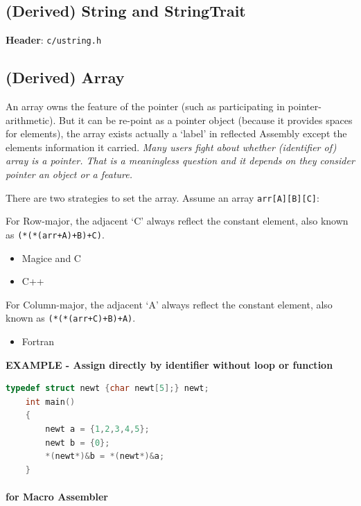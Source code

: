 

\subsection{(Derived) String and StringTrait}

\textbf{Header}: \verb|c/ustring.h|



\subsection{(Derived) Array}

An array owns the feature of the pointer (such as participating in pointer-arithmetic). But it can be re-point as a pointer object (because it provides spaces for elements), the array exists actually a `label' in reflected Assembly except the elements information it carried. \textit{Many users fight about whether (identifier of) array is a pointer. That is a meaningless question and it depends on they consider pointer an object or a feature.}

There are two strategies to set the array. Assume an array \verb|arr[A][B][C]|:

For Row-major, the adjacent `C' always reflect the constant element, also known as \verb|(*(*(arr+A)+B)+C)|.

\begin{itemize}

\item Magice and C
\item C++
\end{itemize}

For Column-major, the adjacent `A' always reflect the constant element, also known as \verb|(*(*(arr+C)+B)+A)|.

\begin{itemize}

\item Fortran
\end{itemize}

\textbf{EXAMPLE - Assign directly by identifier without loop or function}

\begin{lstlisting}[language=C]
	typedef struct newt {char newt[5];} newt;
	int main()
	{
		newt a = {1,2,3,4,5};
		newt b = {0};
		*(newt*)&b = *(newt*)&a;
	}
\end{lstlisting}



\paragraph{for Macro Assembler} \

